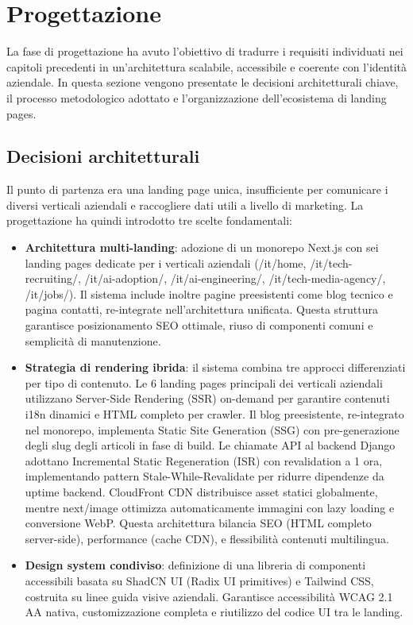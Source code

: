 \chapter{Progettazione}

La fase di progettazione ha avuto l'obiettivo di tradurre i requisiti individuati
nei capitoli precedenti in un'architettura scalabile, accessibile e coerente con
l'identità aziendale. In questa sezione vengono presentate le decisioni
architetturali chiave, il processo metodologico adottato e l'organizzazione
dell'ecosistema di landing pages.

\section{Decisioni architetturali}
Il punto di partenza era una landing page unica, insufficiente per comunicare i
diversi verticali aziendali e raccogliere dati utili a livello di marketing. La
progettazione ha quindi introdotto tre scelte fondamentali:

\begin{itemize}
  \item \textbf{Architettura multi-landing}: adozione di un monorepo Next.js con sei landing pages dedicate per i verticali aziendali (/it/home, /it/tech-recruiting/, 
/it/ai-adoption/, /it/ai-engineering/, /it/tech-media-agency/, /it/jobs/). Il sistema 
include inoltre pagine preesistenti come blog tecnico e pagina contatti, 
re-integrate nell'architettura unificata. Questa struttura garantisce posizionamento 
SEO ottimale, riuso di componenti comuni e semplicità di manutenzione.
  
  \item \textbf{Strategia di rendering ibrida}: il sistema combina tre approcci 
differenziati per tipo di contenuto. Le 6 landing pages principali dei verticali 
aziendali utilizzano Server-Side Rendering (SSR) on-demand per garantire contenuti 
i18n dinamici e HTML completo per crawler. Il blog preesistente, re-integrato nel 
monorepo, implementa Static Site Generation (SSG) con pre-generazione degli slug 
degli articoli in fase di build. Le chiamate API al backend Django adottano 
Incremental Static Regeneration (ISR) con revalidation a 1 ora, implementando 
pattern Stale-While-Revalidate per ridurre dipendenze da uptime backend. CloudFront 
CDN distribuisce asset statici globalmente, mentre next/image ottimizza 
automaticamente immagini con lazy loading e conversione WebP. Questa architettura 
bilancia SEO (HTML completo server-side), performance (cache CDN), e flessibilità 
contenuti multilingua.
  
  \item \textbf{Design system condiviso}: definizione di una libreria di componenti 
  accessibili basata su ShadCN UI (Radix UI primitives) e Tailwind CSS, costruita 
  su linee guida visive aziendali. Garantisce accessibilità WCAG 2.1 AA nativa, 
  customizzazione completa e riutilizzo del codice UI tra le landing.
\end{itemize}

